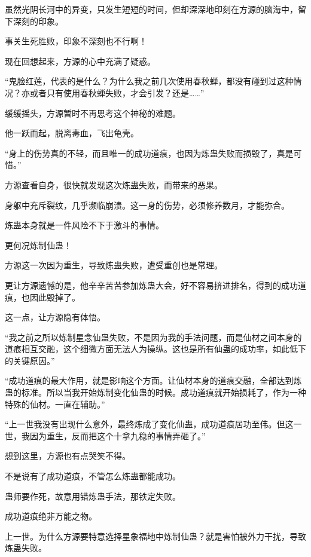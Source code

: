 
\begin{this_body}

虽然光阴长河中的异变，只发生短短的时间，但却深深地印刻在方源的脑海中，留下深刻的印象。

事关生死胜败，印象不深刻也不行啊！

现在回想起来，方源的心中充满了疑惑。

“鬼脸红莲，代表的是什么？为什么我之前几次使用春秋蝉，都没有碰到过这种情况？亦或者只有使用春秋蝉失败，才会引发？还是……”

缓缓摇头，方源暂时不再思考这个神秘的难题。

他一跃而起，脱离毒血，飞出龟壳。

“身上的伤势真的不轻，而且唯一的成功道痕，也因为炼蛊失败而损毁了，真是可惜。”

方源查看自身，很快就发现这次炼蛊失败，而带来的恶果。

身躯中充斥裂纹，几乎濒临崩溃。这一身的伤势，必须修养数月，才能弥合。

炼蛊本身就是一件风险不下于激斗的事情。

更何况炼制仙蛊！

方源这一次因为重生，导致炼蛊失败，遭受重创也是常理。

更让方源遗憾的是，他辛辛苦苦参加炼蛊大会，好不容易挤进排名，得到的成功道痕，也因此毁掉了。

这一点，让方源隐有体悟。

“我之前之所以炼制星念仙蛊失败，不是因为我的手法问题，而是仙材之间本身的道痕相互交融，这个细微方面无法人为操纵。这也是所有仙蛊的成功率，如此低下的关键原因。”

“成功道痕的最大作用，就是影响这个方面。让仙材本身的道痕交融，全部达到炼蛊的标准。所以当我开始炼制变化仙蛊的时候。成功道痕就开始损耗了，作为一种特殊的仙材。一直在辅助。”

“上一世我没有出现什么意外，最终炼成了变化仙蛊，成功道痕居功至伟。但这一世，我因为重生，反而把这个十拿九稳的事情弄砸了。”

想到这里，方源也有点哭笑不得。

不是说有了成功道痕，不管怎么炼蛊都能成功。

蛊师要作死，故意用错炼蛊手法，那铁定失败。

成功道痕绝非万能之物。

上一世。为什么方源要特意选择星象福地中炼制仙蛊？就是害怕被外力干扰，导致炼蛊失败。


\end{this_body}
